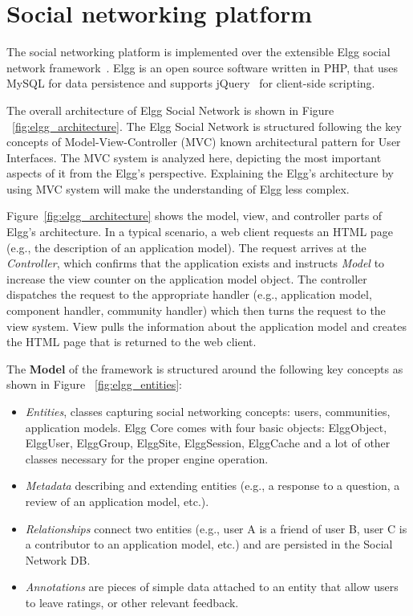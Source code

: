 \section{Social networking platform}
\label{sec:implementaion_of_social_netowrk}
The social networking platform is implemented over the extensible Elgg social network framework~\cite{elgg_url}.  Elgg is an open source software written in PHP, that uses MySQL for data persistence and supports jQuery~\cite{jquery_url} for client-side scripting.  

The overall architecture of Elgg Social Network is shown in Figure ~\ref{fig:elgg_architecture}. The Elgg Social Network is structured following the key concepts of Model-View-Controller (MVC) known architectural pattern for User Interfaces. The MVC system is analyzed here, depicting the most important aspects of it from the Elgg's perspective. Explaining the Elgg's architecture by using MVC system will make the understanding of Elgg less complex.

Figure~\ref{fig:elgg_architecture} shows the model, view, and controller parts of Elgg's architecture. In a typical scenario, a web client requests an HTML page (e.g., the description of an application model).  The request arrives at the \emph{Controller}, which confirms that the application exists and instructs \emph{Model} to increase the view counter on the application model object. The controller dispatches the request to the appropriate handler (e.g., application model, component handler, community handler) which then turns the request to the view system. View pulls the information about the application model and creates the HTML page that is returned to the web client.

The {\bf Model} of the framework is structured around the following key concepts as shown in Figure ~\ref{fig:elgg_entities}:
\begin{itemize}
\item \emph{Entities}, classes capturing social networking concepts: users, communities, application models. Elgg Core comes with four basic objects: ElggObject, ElggUser, ElggGroup, ElggSite, ElggSession, ElggCache and a lot of other classes necessary for the proper engine operation.
\item \emph{Metadata} describing and extending entities (e.g., a response to a question, a review of an application model, etc.).
\item  \emph{Relationships} connect two entities (e.g., user A is a friend of user B, user C is a contributor to an application model, etc.) and are persisted in the Social Network DB.
\item \emph{Annotations} are pieces of simple data attached to an entity that allow users to leave ratings, or other relevant feedback.
\end{itemize}

